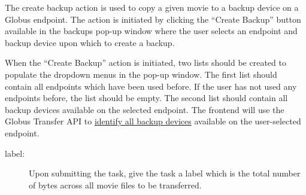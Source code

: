 
The create backup action is used to copy a given movie to a backup device on a Globus
endpoint. The action is initiated by clicking the ``Create Backup'' button available
in the backups pop-up window where the user selects an endpoint and backup device
upon which to create a backup.

When the ``Create Backup'' action is initiated, two lists should be created to populate
the dropdown menus in the pop-up window. The first list should contain all endpoints
which have been used before. If the user has not used any endpoints before, the list
should be empty. The second list should contain all backup devices available on the
selected endpoint. The frontend will use the Globus Transfer API to 
\href{appendix:identifybackupdevices}{identify all backup devices} available on the 
user-selected endpoint.

\begin{description}
    \item[label:] Upon submitting the task, give the task a label which is the total number 
                  of bytes across all movie files to be transferred.
\end{description}


